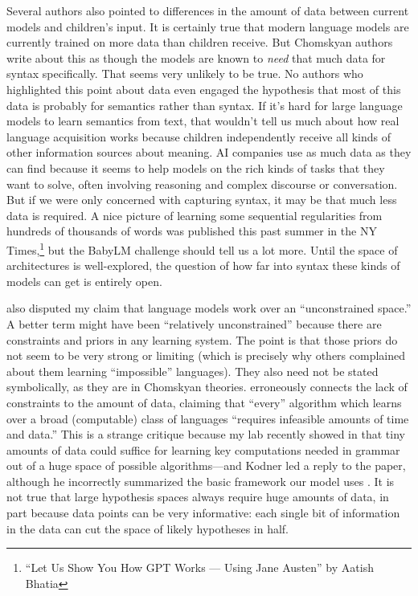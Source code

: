 \documentclass[output=paper,colorlinks,citecolor=brown
]{langscibook}
\begin{document}
Several authors also pointed to differences in the amount of data between current models and children's input. It is certainly true that modern language models are currently trained on more data than children receive. But Chomskyan authors write about this as though the models are known to \emph{need} that much data for syntax specifically. That seems very unlikely to be true. No authors who highlighted this point about data even engaged the hypothesis that most of this data is probably for semantics rather than syntax. If it's hard for large language models to learn semantics from text, that wouldn't tell us much about how real language acquisition works because children independently receive all kinds of other information sources about meaning. AI companies use as much data as they can find because it seems to help models on the rich kinds of tasks that they want to solve, often involving reasoning and complex discourse or conversation. But if we were only concerned with capturing syntax, it may be that much less data is required. A nice picture of learning some sequential regularities from  hundreds of thousands of words was published this past summer in the NY Times,\footnote{``Let Us Show You How GPT Works — Using Jane Austen'' by  Aatish Bhatia} but the BabyLM challenge should tell us a lot more. Until the space of architectures is well-explored, the question of how far into syntax these kinds of models can get is entirely open. 

\cite{kodner2023linguistics} also disputed my claim that language models work over an ``unconstrained space.'' A better term might have been ``relatively unconstrained'' because there are constraints and priors in any learning system. The point is that those priors do not seem to be very strong or limiting (which is precisely why others complained about them learning ``impossible'' languages). They also need not be stated symbolically, as they are in Chomskyan theories. \cite{kodner2023linguistics} erroneously connects the lack of constraints to the amount of data, claiming that ``every'' algorithm which learns over a broad (computable) class of languages ``requires infeasible amounts of time and data.'' This is a strange critique because my lab recently showed in \cite{yang2022one} that tiny amounts of data could suffice for learning key computations needed in grammar out of a huge space of possible algorithms---and Kodner led a reply to the paper,  although he incorrectly summarized the basic framework our model uses \citep{piantadosi2022reply}. It is not true that large hypothesis spaces always require huge amounts of data, in part because data points can be very informative: each single bit of information in the data can cut the space of likely hypotheses in half. 
\end{document}
